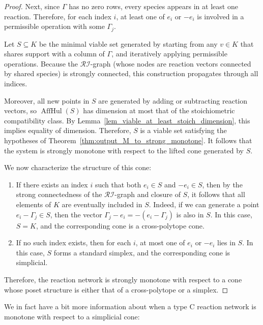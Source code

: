 \documentclass{article}
\begin{document}
\begin{proof}
Next, since \( \Gamma \) has no zero rows, every species appears in at least one reaction. Therefore, for each index \( i \), at least one of \( e_i \) or \( -e_i \) is involved in a permissible operation with some \( \Gamma_j \).

Let \( S \subseteq K \) be the minimal viable set generated by starting from any \( v \in K \) that shares support with a column of \( \Gamma \), and iteratively applying permissible operations. Because the $\mathcal{RI}$-graph (whose nodes are reaction vectors connected by shared species) is strongly connected, this construction propagates through all indices.

Moreover, all new points in \( S \) are generated by adding or subtracting reaction vectors, so \( \operatorname{AffHul}(S) \) has dimension at most that of the stoichiometric compatibility class. By Lemma~\ref{lem_viable_at_least_stoich_dimension}, this implies equality of dimension. Therefore, \( S \) is a viable set satisfying the hypotheses of Theorem~\ref{thm:output_M_to_strong_monotone}. It follows that the system is strongly monotone with respect to the lifted cone generated by \( S \).

We now characterize the structure of this cone:
\begin{enumerate}
    \item If there exists an index \( i \) such that both \( e_i \in S \) and \( -e_i \in S \), then by the strong connectedness of the $\mathcal{RI}$-graph and closure of \( S \), it follows that all elements of \( K \) are eventually included in \( S \). Indeed, if we can generate a point \( e_i - \Gamma_j \in S \), then the vector \( \Gamma_j - e_i = - (e_i - \Gamma_j) \) is also in \( S \). In this case, \( S = K \), and the corresponding cone is a cross-polytope cone.
    
    \item If no such index exists, then for each \( i \), at most one of \( e_i \) or \( -e_i \) lies in \( S \). In this case, \( S \) forms a standard simplex, and the corresponding cone is simplicial.
\end{enumerate}

Therefore, the reaction network is strongly monotone with respect to a cone whose poset structure is either that of a cross-polytope or a simplex.
\end{proof}



We in fact have a bit more information about when a type C reaction network is monotone with respect to a simplicial cone:
\end{document}

